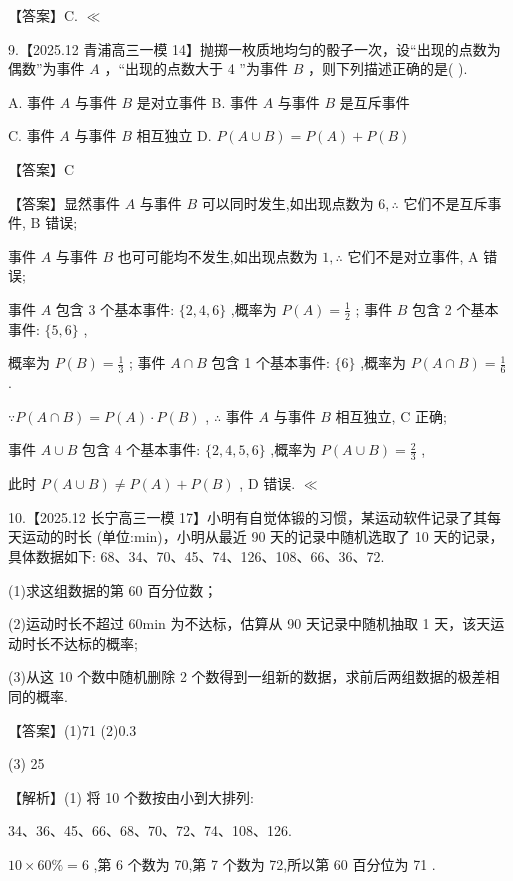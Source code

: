 \documentclass[10pt]{article}
\begin{document}
【答案】C. \(\ll\)

9.【2025.12 青浦高三一模 14】抛掷一枚质地均匀的骰子一次，设“出现的点数为偶数”为事件 \(A\) ，“出现的点数大于 4 ”为事件 \(B\) ，则下列描述正确的是( ).

A. 事件 \(A\) 与事件 \(B\) 是对立事件 B. 事件 \(A\) 与事件 \(B\) 是互斥事件

C. 事件 \(A\) 与事件 \(B\) 相互独立 D. \(P\left( {A \cup  B}\right)  = P\left( A\right)  + P\left( B\right)\)

【答案】C

【答案】显然事件 \(A\) 与事件 \(B\) 可以同时发生,如出现点数为 \(6,\therefore\) 它们不是互斥事件, \(\mathrm{B}\) 错误;

事件 \(A\) 与事件 \(B\) 也可可能均不发生,如出现点数为 \(1,\therefore\) 它们不是对立事件, \(\mathrm{A}\) 错误;

事件 \(A\) 包含 3 个基本事件: \(\{ 2,4,6\}\) ,概率为 \(P\left( A\right)  = \frac{1}{2}\) ; 事件 \(B\) 包含 2 个基本事件: \(\{ 5,6\}\) ,

概率为 \(P\left( B\right)  = \frac{1}{3}\) ; 事件 \(A \cap  B\) 包含 1 个基本事件: \(\{ 6\}\) ,概率为 \(P\left( {A \cap  B}\right)  = \frac{1}{6}\) .

\(\because P\left( {A \cap  B}\right)  = P\left( A\right)  \cdot  P\left( B\right)\) , \(\therefore\) 事件 \(A\) 与事件 \(B\) 相互独立, \(\mathrm{C}\) 正确;

事件 \(A \cup  B\) 包含 4 个基本事件: \(\{ 2,4,5,6\}\) ,概率为 \(P\left( {A \cup  B}\right)  = \frac{2}{3}\) ,

此时 \(P\left( {A \cup  B}\right)  \neq  P\left( A\right)  + P\left( B\right)\) , D 错误. \(\ll\)

10.【2025.12 长宁高三一模 17】小明有自觉体锻的习惯，某运动软件记录了其每天运动的时长 (单位:min)，小明从最近 90 天的记录中随机选取了 10 天的记录，具体数据如下: 68、34、70、45、74、126、108、66、36、72.

(1)求这组数据的第 60 百分位数；

(2)运动时长不超过 60min 为不达标，估算从 90 天记录中随机抽取 1 天，该天运动时长不达标的概率;

(3)从这 10 个数中随机删除 2 个数得到一组新的数据，求前后两组数据的极差相同的概率.

【答案】(1)71 (2)0.3

(3) 25

【解析】(1) 将 10 个数按由小到大排列:

34、36、45、66、68、70、72、74、108、126.

\({10} \times  {60}\%  = 6\) ,第 6 个数为 70,第 7 个数为 72,所以第 60 百分位为 71 .
\end{document}
